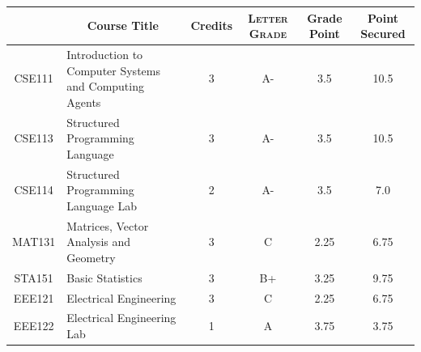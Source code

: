 \documentclass[11pt]{article}
\newcommand*{\numtwo}[1]{\pgfmathprintnumber[
                    fixed, precision=2, fixed zerofill=true]{#1}}
\begin{document}
                \begin{center}
                    \renewcommand{\arraystretch}{1.08}
                    
                \begin{tabular}{|c|l|c|>{\scshape}c|c|c|}
                \hline  \rule[-1ex]{0pt}{3.5ex} {\centering{\bf Course Code}} &  \multicolumn{1}{c|}{\textbf{Course Title}}  & {\bf Credits} & {\bf Letter Grade} & {\bf Grade Point} & {\bf Point Secured}  \\ 
                \hline   CSE111 &  Introduction to Computer Systems and Computing Agents		 & 3 & A- & 3.5 & 10.5 \\ %
                \hline   CSE113 &  Structured Programming Language		 & 3 & A- & 3.5 & 10.5 \\ %
                \hline   CSE114 &  Structured Programming Language Lab		 & 2 & A- & 3.5 & 7.0 \\ %
                \hline   MAT131 &  Matrices, Vector Analysis and Geometry		 & 3 & C & 2.25 & 6.75 \\ %
                \hline   STA151 &  Basic Statistics		 & 3 & B+ & 3.25 & 9.75 \\ %
                \hline   EEE121 &  Electrical Engineering		 & 3 & C & 2.25 & 6.75 \\ %
                \hline   EEE122 &  Electrical Engineering Lab		 & 1 & A & 3.75 & 3.75 \\ %

\hline                %
                \end{tabular}
                \end{center}
                \renewcommand{\arraystretch}{1.03}
\end{document}
